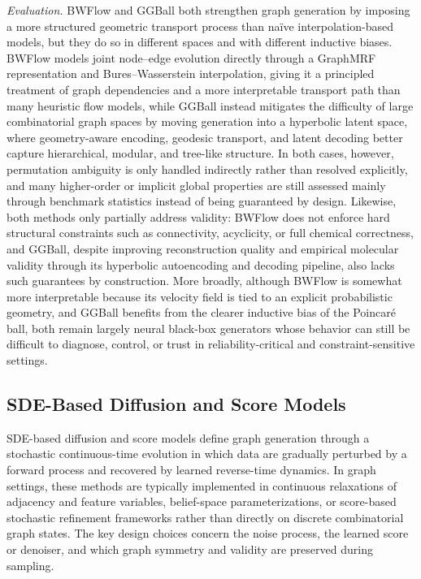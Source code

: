 \documentclass{article}
\begin{document}
\emph{Evaluation.} BWFlow and GGBall both strengthen graph generation by imposing a more structured geometric transport process than naïve interpolation-based models, but they do so in different spaces and with different inductive biases. BWFlow models joint node--edge evolution directly through a GraphMRF representation and Bures--Wasserstein interpolation, giving it a principled treatment of graph dependencies and a more interpretable transport path than many heuristic flow models, while GGBall instead mitigates the difficulty of large combinatorial graph spaces by moving generation into a hyperbolic latent space, where geometry-aware encoding, geodesic transport, and latent decoding better capture hierarchical, modular, and tree-like structure. In both cases, however, permutation ambiguity is only handled indirectly rather than resolved explicitly, and many higher-order or implicit global properties are still assessed mainly through benchmark statistics instead of being guaranteed by design. Likewise, both methods only partially address validity: BWFlow does not enforce hard structural constraints such as connectivity, acyclicity, or full chemical correctness, and GGBall, despite improving reconstruction quality and empirical molecular validity through its hyperbolic autoencoding and decoding pipeline, also lacks such guarantees by construction. More broadly, although BWFlow is somewhat more interpretable because its velocity field is tied to an explicit probabilistic geometry, and GGBall benefits from the clearer inductive bias of the Poincaré ball, both remain largely neural black-box generators whose behavior can still be difficult to diagnose, control, or trust in reliability-critical and constraint-sensitive settings.

\subsection{SDE-Based Diffusion and Score Models}
\label{sec:sde_models}

SDE-based diffusion and score models define graph generation through a stochastic continuous-time evolution in which data are gradually perturbed by a forward process and recovered by learned reverse-time dynamics. In graph settings, these methods are typically implemented in continuous relaxations of adjacency and feature variables, belief-space parameterizations, or score-based stochastic refinement frameworks rather than directly on discrete combinatorial graph states. The key design choices concern the noise process, the learned score or denoiser, and which graph symmetry and validity are preserved during sampling.
\end{document}
